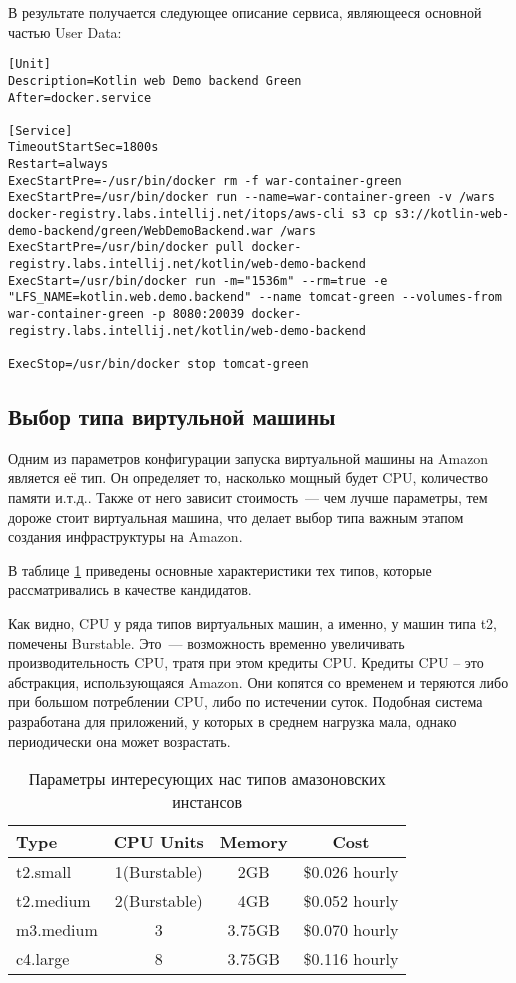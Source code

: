 	В результате получается следующее описание сервиса, являющееся основной частью User Data:
\begin{lstlisting}
[Unit]
Description=Kotlin web Demo backend Green
After=docker.service

[Service]
TimeoutStartSec=1800s
Restart=always
ExecStartPre=-/usr/bin/docker rm -f war-container-green
ExecStartPre=/usr/bin/docker run --name=war-container-green -v /wars docker-registry.labs.intellij.net/itops/aws-cli s3 cp s3://kotlin-web-demo-backend/green/WebDemoBackend.war /wars
ExecStartPre=/usr/bin/docker pull docker-registry.labs.intellij.net/kotlin/web-demo-backend
ExecStart=/usr/bin/docker run -m="1536m" --rm=true -e "LFS_NAME=kotlin.web.demo.backend" --name tomcat-green --volumes-from war-container-green -p 8080:20039 docker-registry.labs.intellij.net/kotlin/web-demo-backend

ExecStop=/usr/bin/docker stop tomcat-green
\end{lstlisting}

\subsection{Выбор типа виртульной машины}
	Одним из параметров конфигурации запуска виртуальной машины на Amazon является её тип. Он определяет то, насколько мощный будет CPU, количество памяти и.т.д.. Также от него зависит стоимость~--- чем лучше параметры, тем дороже стоит виртуальная машина, что делает выбор типа  важным этапом создания инфраструктуры на Amazon.
	
	В таблице \ref{table:instance_types} приведены основные характеристики тех типов, которые рассматривались в качестве кандидатов.
	
	Как видно, CPU у ряда типов виртуальных машин, а именно, у машин типа t2, помечены Burstable. Это~--- возможность временно увеличивать производительность CPU, тратя при этом кредиты CPU. Кредиты CPU -- это абстракция, использующаяся Amazon. Они копятся со временем и теряются либо при большом потреблении CPU, либо по истечении суток. Подобная система разработана для приложений, у которых в среднем нагрузка мала, однако периодически она может возрастать.
	
\begin{table}[ht]
	\centering
	\begin{tabular}{l|c|c|c}
		Type      & CPU Units    & Memory & Cost\\ \hline
		t2.small  & 1(Burstable) & 2GB    & \$0.026 hourly\\ \hline
		t2.medium & 2(Burstable) & 4GB    & \$0.052 hourly\\ \hline
		m3.medium & 3            & 3.75GB & \$0.070 hourly\\ \hline
		c4.large  & 8            & 3.75GB & \$0.116 hourly\\
	\end{tabular}
	\caption{Параметры интересующих нас типов амазоновских инстансов}
	\label{table:instance_types}
\end{table}
	
